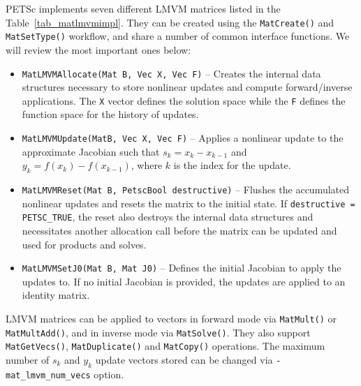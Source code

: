 PETSc implements seven different LMVM matrices listed in the Table~\ref{tab_matlmvmimpl}. They can be created using
the \lstinline{MatCreate()} and \lstinline{MatSetType()} workflow, and share a number of common interface functions.
We will review the most important ones below:
\begin{itemize}
  \item \lstinline{MatLMVMAllocate(Mat B, Vec X, Vec F)} -- Creates the internal data structures necessary to store
  nonlinear updates and compute forward/inverse applications. The \lstinline{X} vector defines the solution space while
  the \lstinline{F} defines the function space for the history of updates.
  \item \lstinline{MatLMVMUpdate(MatB, Vec X, Vec F)} -- Applies a nonlinear update to the approximate Jacobian such
  that $s_k = x_k - x_{k-1}$ and $y_k = f(x_k) - f(x_{k-1})$, where $k$ is the index for the update.
  \item \lstinline{MatLMVMReset(Mat B, PetscBool destructive)} -- Flushes the accumulated nonlinear updates and resets
  the matrix to the initial state. If \lstinline{destructive = PETSC_TRUE}, the reset also destroys the internal data
  structures and necessitates another allocation call before the matrix can be updated and used for products and solves.
  \item \lstinline{MatLMVMSetJ0(Mat B, Mat J0)} -- Defines the initial Jacobian to apply the updates to. If no initial
  Jacobian is provided, the updates are applied to an identity matrix.
\end{itemize}

LMVM matrices can be applied to vectors in forward mode via \lstinline{MatMult()} or \lstinline{MatMultAdd()}, and
in inverse mode via \lstinline{MatSolve()}. They also support \lstinline{MatGetVecs()}, \lstinline{MatDuplicate()} and
\lstinline{MatCopy()} operations. The maximum number of $s_k$ and $y_k$ update vectors stored can be changed via
\lstinline{-mat_lmvm_num_vecs} option.

